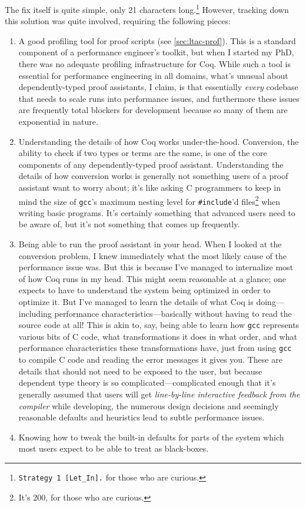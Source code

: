 The fix itself is quite simple, only 21 characters long.\footnote{\texttt{Strategy 1 [Let\_In].} for those who are curious.}
However, tracking down this solution was quite involved, requiring the following pieces:
\begin{enumerate}
  \item
    A good profiling tool for proof scripts (see \autoref{sec:ltac-prof}).
    This is a standard component of a performance engineer's toolkit, but when I started my PhD, there was no adequate profiling infrastructure for Coq.
    While such a tool is essential for performance engineering in all domains, what's unusual about dependently-typed proof assistants, I claim, is that essentially \emph{every} codebase that needs to scale runs into performance issues, and furthermore these issues are frequently total blockers for development because so many of them are exponential in nature.
  \item
    Understanding the details of how Coq works under-the-hood.
    Conversion, the ability to check if two types or terms are the same, is one of the core components of any dependently-typed proof assistant.
    Understanding the details of how conversion works is generally not something users of a proof assistant want to worry about; it's like asking C programmers to keep in mind the size of \texttt{gcc}'s maximum nesting level for \texttt{\#include}'d files\footnote{It's 200, for those who are curious.} when writing basic programs.
    It's certainly something that advanced users need to be aware of, but it's not something that comes up frequently.
  \item
    Being able to run the proof assistant in your head.
    When I looked at the conversion problem, I knew immediately what the most likely cause of the performance issue was.
    But this is because I've managed to internalize most of how Coq runs in my head.
    This might seem reasonable at a glance; one expects to have to understand the system being optimized in order to optimize it.
    But I've managed to learn the details of what Coq is doing---including performance characteristics---basically without having to read the source code at all!
    This is akin to, say, being able to learn how \texttt{gcc} represents various bits of C code, what transformations it does in what order, and what performance characteristics these transformations have, just from using \texttt{gcc} to compile C code and reading the error messages it gives you.
    These are details that should not need to be exposed to the user, but because dependent type theory is so complicated---complicated enough that it's generally assumed that users will get \emph{line-by-line interactive feedback from the compiler} while developing, the numerous design decisions and seemingly reasonable defaults and heuristics lead to subtle performance issues.
  \item
    Knowing how to tweak the built-in defaults for parts of the system which most users expect to be able to treat as black-boxes.
\end{enumerate}

